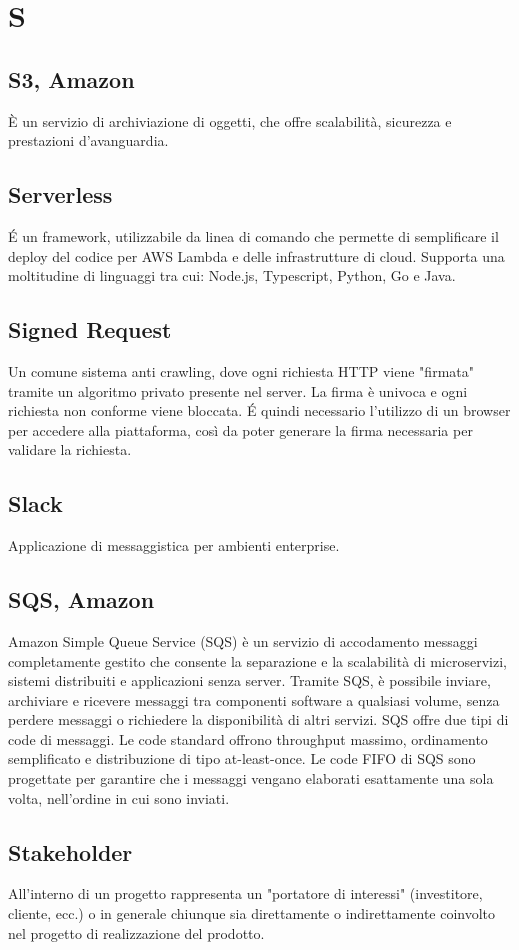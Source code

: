 \section{S}

\subsection{S3, Amazon}
È un servizio di archiviazione di oggetti, che offre scalabilità, sicurezza e prestazioni d'avanguardia. 

\subsection{Serverless}
\'E un framework, utilizzabile da linea di comando che permette di semplificare il deploy del codice per AWS Lambda e delle infrastrutture di cloud. Supporta una moltitudine di linguaggi tra cui: Node.js, Typescript, Python, Go e Java.

\subsection{Signed Request}
Un comune sistema anti crawling, dove ogni richiesta HTTP viene "firmata" tramite un algoritmo privato presente nel server. La firma è univoca e ogni richiesta non conforme viene bloccata. \'E quindi necessario l'utilizzo di un browser per accedere alla piattaforma, così da poter generare la firma necessaria per validare la richiesta.

\subsection{Slack}
Applicazione di messaggistica per ambienti enterprise.

\subsection{SQS, Amazon}
Amazon Simple Queue Service (SQS) è un servizio di accodamento messaggi completamente gestito che consente la separazione e la scalabilità di microservizi, sistemi distribuiti e applicazioni senza server. Tramite SQS, è possibile inviare, archiviare e ricevere messaggi tra componenti software a qualsiasi volume, senza perdere messaggi o richiedere la disponibilità di altri servizi.
SQS offre due tipi di code di messaggi. Le code standard offrono throughput massimo, ordinamento semplificato e distribuzione di tipo at-least-once. Le code FIFO di SQS sono progettate per garantire che i messaggi vengano elaborati esattamente una sola volta, nell'ordine in cui sono inviati.

\subsection{Stakeholder}
All'interno di un progetto rappresenta un "portatore di interessi" (investitore, cliente, ecc.) o in generale chiunque sia direttamente o indirettamente coinvolto nel progetto di realizzazione del prodotto.

\clearpage